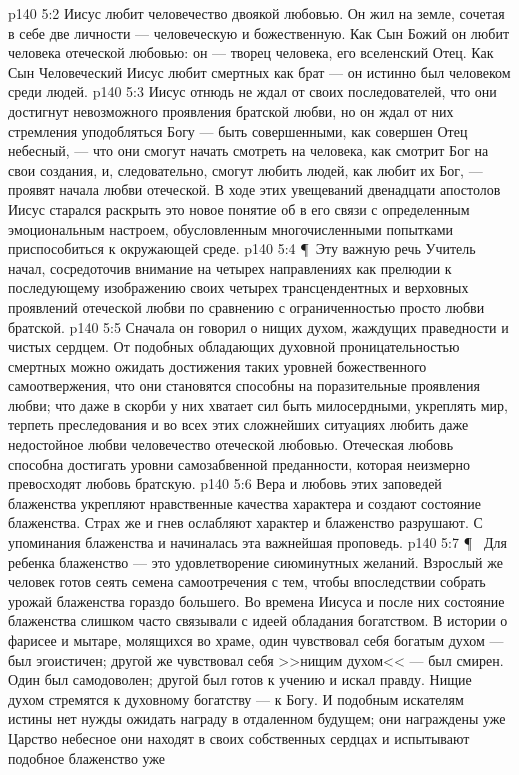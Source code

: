 \vs p140 5:2 Иисус любит человечество двоякой любовью. Он жил на земле, сочетая в себе две личности --- человеческую и божественную. Как Сын Божий он любит человека отеческой любовью: он --- творец человека, его вселенский Отец. Как Сын Человеческий Иисус любит смертных как брат --- он истинно был человеком среди людей.
\vs p140 5:3 Иисус отнюдь не ждал от своих последователей, что они достигнут невозможного проявления братской любви, но он ждал от них стремления уподобляться Богу --- быть совершенными, как совершен Отец небесный, --- что они смогут начать смотреть на человека, как смотрит Бог на свои создания, и, следовательно, смогут любить людей, как любит их Бог, --- проявят начала любви отеческой. В ходе этих увещеваний двенадцати апостолов Иисус старался раскрыть это новое понятие об  в его связи с определенным эмоциональным настроем, обусловленным многочисленными попытками приспособиться к окружающей среде.
\vs p140 5:4 \P\ Эту важную речь Учитель начал, сосредоточив внимание на четырех направлениях  как прелюдии к последующему изображению своих четырех трансцендентных и верховных проявлений отеческой любви по сравнению с ограниченностью просто любви братской.
\vs p140 5:5 Сначала он говорил о нищих духом, жаждущих праведности и чистых сердцем. От подобных обладающих духовной проницательностью смертных можно ожидать достижения таких уровней божественного самоотвержения, что они становятся способны на поразительные проявления  любви; что даже в скорби у них хватает сил быть милосердными, укреплять мир, терпеть преследования и во всех этих сложнейших ситуациях любить даже недостойное любви человечество отеческой любовью. Отеческая любовь способна достигать уровни самозабвенной преданности, которая неизмерно превосходят любовь братскую.
\vs p140 5:6 Вера и любовь этих заповедей блаженства укрепляют нравственные качества характера и создают состояние блаженства. Страх же и гнев ослабляют характер и блаженство разрушают. С упоминания блаженства и начиналась эта важнейшая проповедь.
\vs p140 5:7 \P\ \bibnobreakspace {} Для ребенка блаженство --- это удовлетворение сиюминутных желаний. Взрослый же человек готов сеять семена самоотречения с тем, чтобы впоследствии собрать урожай блаженства гораздо большего. Во времена Иисуса и после них состояние блаженства слишком часто связывали с идеей обладания богатством. В истории о фарисее и мытаре, молящихся во храме, один чувствовал себя богатым духом --- был эгоистичен; другой же чувствовал себя >>нищим духом<< --- был смирен. Один был самодоволен; другой был готов к учению и искал правду. Нищие духом стремятся к духовному богатству --- к Богу. И подобным искателям истины нет нужды ожидать награду в отдаленном будущем; они награждены уже  Царство небесное они находят в своих собственных сердцах и испытывают подобное блаженство уже 
